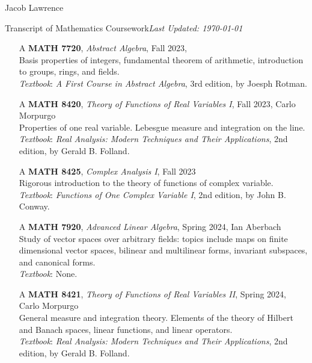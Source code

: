 \documentclass{article}
\begin{document}
\huge Jacob Lawrence

\large Transcript of Mathematics Coursework\hfill \normalsize \textit{Last Updated: \today}

\begin{enumerate}
    \item[A] \textbf{MATH 7720}, \textit{Abstract Algebra}, Fall 2023, \\ 
    Basis properties of integers, fundamental theorem of arithmetic, introduction to groups, rings, and fields.\\
    \textit{Textbook}: \textit{A First Course in Abstract Algebra}, 3rd edition, by Joesph Rotman.  

    \item[A] \textbf{MATH 8420}, \textit{Theory of Functions of Real Variables I}, Fall 2023, Carlo Morpurgo\\
    Properties of one real variable. Lebesgue measure and integration on the line. \\
    \textit{Textbook}: \textit{Real Analysis: Modern Techniques and Their Applications}, 2nd edition, by Gerald B. Folland. 

    \item[A] \textbf{MATH 8425}, \textit{Complex Analysis I}, Fall 2023\\
    Rigorous introduction to the theory of functions of complex variable. \\
    \textit{Textbook}: \textit{Functions of One Complex Variable I}, 2nd edition, by John B. Conway. 
    
    \item[A] \textbf{MATH 7920}, \textit{Advanced Linear Algebra}, Spring 2024, Ian Aberbach\\
    Study of vector spaces over arbitrary fields: topics include maps on finite dimensional vector spaces, bilinear and multilinear forms, invariant subspaces, and canonical forms. \\
    \textit{Textbook}: None.  

    \item[A] \textbf{MATH 8421}, \textit{Theory of Functions of Real Variables II}, Spring 2024, Carlo Morpurgo \\
    General measure and integration theory. Elements of the theory of Hilbert and Banach spaces, linear functions, and linear operators. \\
    \textit{Textbook}: \textit{Real Analysis: Modern Techniques and Their Applications}, 2nd edition, by Gerald B. Folland. 


\end{enumerate}
\end{document}

